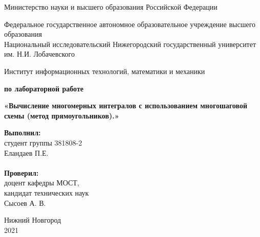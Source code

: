 \documentclass{report}
\begin{document}
 \begin{titlepage}

 \begin{center}
 Министерство науки и высшего образования Российской Федерации
 \end{center}

 \begin{center}
 Федеральное государственное автономное образовательное учреждение высшего образования \\
 Национальный исследовательский Нижегородский государственный университет им. Н.И. Лобачевского
 \end{center}

 \begin{center}
 Институт информационных технологий, математики и механики
 \end{center}

 \vspace{4em}

 \begin{center}
 \textbf{ по лабораторной работе} \\
 \end{center}
 \begin{center}
 \textbf{\Large«Вычисление многомерных интегралов с использованием многошаговой схемы (метод прямоугольников).»} \\
 \end{center}

 \vspace{4em}

 \newbox{\lbox}
 \newlength{\maxl}
 \setlength{\maxl}{\wd\lbox}
 \hfill\parbox{7cm}{
 \hspace*{5cm}\hspace*{-5cm}\textbf{Выполнил:} \\ студент группы 381808-2 \\ Еландаев П.Е. \\
 \\
 \hspace*{5cm}\hspace*{-5cm}\textbf{Проверил:}\\ доцент кафедры МОСТ, \\ кандидат технических наук \\ Сысоев А. В. \\
 }
 \vspace{\fill}

 \begin{center} Нижний Новгород \\ 2021 \end{center}

 \end{titlepage}
\end{document}
